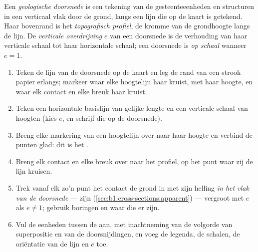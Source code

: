\begin{definition}\label{def:b1:cross-sections:section}
Een \emph{geologische doorsnede} is een tekening van de gesteenteeenheden en
structuren in een verticaal vlak door de grond, langs een lijn die op de kaart is getekend. Haar bovenrand
is het \emph{topografisch profiel}, de kromme van de grondhoogte langs de lijn.
De \emph{verticale overdrijving} $e$ van een doorsnede is de verhouding van
haar verticale schaal tot haar horizontale schaal; een doorsnede is \emph{op schaal} wanneer $e = 1$.
\end{definition}

\begin{method}\label{met:b1:cross-sections:construct}
\begin{enumerate}
  \item Teken de lijn van de doorsnede op de kaart en leg de rand van een strook papier erlangs; markeer
        waar elke hoogtelijn haar kruist, met haar hoogte, en waar elk contact en elke breuk haar kruist.
  \item Teken een horizontale basislijn van gelijke lengte en een verticale schaal van hoogten (kies $e$,
        en schrijf die op de doorsnede).
  \item Breng elke markering van een hoogtelijn over naar haar hoogte en verbind de punten glad: dit is het
        .
  \item Breng elk contact en elke breuk over naar het profiel, op het punt waar zij de lijn kruisen.
  \item Trek vanaf elk zo'n punt het contact de grond in met zijn helling \emph{in het vlak van de doorsnede}
        --- zijn  (\cref{sec:b1:cross-sections:apparent}) --- vergroot met $e$ als
        $e \ne 1$; gebruik boringen en  waar die er zijn.
  \item Vul de eenheden tussen de  aan, met inachtneming van de volgorde van superpositie en van de
        doorsnijdingen, en voeg de legenda, de schalen, de oriëntatie van de lijn en $e$ toe.
\end{enumerate}
\end{method}

